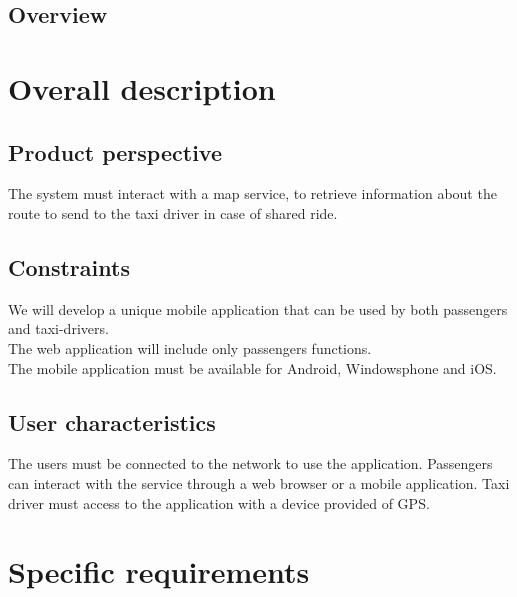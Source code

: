\documentclass[a4paper,11pt]{report}
\begin{document}
\section{Overview}


\chapter*{Overall description}
\addtocounter{chapter}{1}
\section{Product perspective}
The system must interact with a map service, to retrieve information about the route to send to the taxi driver in case of shared ride.
\section{Constraints}
We will develop a unique mobile application that can be used by both passengers and taxi-drivers.\\
The web application will include only passengers functions.\\
The mobile application must be available for Android, Windowsphone and iOS.\\
\section{User characteristics}
The users must be connected to the network to use the application.
Passengers can interact with the service through a web browser or a mobile application.
Taxi driver must access to the application with a device provided of GPS.
\chapter*{Specific requirements}
\addtocounter{chapter}{1}
\end{document}
